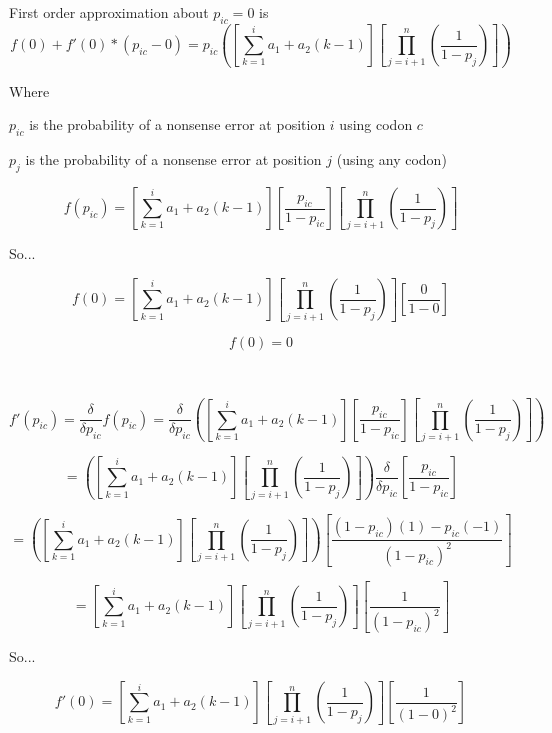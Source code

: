 \documentclass[11pt]{article} %
\begin{document}



First order approximation about $p_{ic} = 0$ is
$$f(0) + f'(0)*(p_{ic}-0)
= p_{ic}\left(
\left[\sum_{k=1}^{i} a_1 + a_2(k-1)\right]
\left[\prod_{j=i+1}^{n}(\frac{1}{1-p_{j}})\right]
\right)
$$

Where

$p_{ic}$ is the probability of a nonsense error at position $i$ using codon $c$

$p_j$ is the probability of a nonsense error at position $j$ (using any codon)

$$f(p_{ic})=
\left[\sum_{k=1}^{i} a_1 + a_2(k-1)\right]
\left[\frac{p_{ic}}{1-p_{ic}}\right]
\left[\prod_{j=i+1}^{n}(\frac{1}{1-p_{j}})\right]$$

So...

$$
f(0)=
\left[\sum_{k=1}^{i} a_1 + a_2(k-1)\right]
\left[\prod_{j=i+1}^{n}(\frac{1}{1-p_{j}})\right]
\left[\frac{0}{1-0}\right]$$

$$f(0)=0$$


\noindent\makebox[\linewidth]{\rule{\textwidth}{1pt}} 

~

$$f'(p_{ic}) = \frac{\delta}{\delta p_{ic}}f(p_{ic})=
\frac{\delta}{\delta p_{ic}}\left(
\left[\sum_{k=1}^{i} a_1 + a_2(k-1)\right]
\left[\frac{p_{ic}}{1-p_{ic}}\right]
\left[\prod_{j=i+1}^{n}(\frac{1}{1-p_{j}})\right]
\right)$$

$$=
\left(
\left[\sum_{k=1}^{i} a_1 + a_2(k-1)\right]
\left[\prod_{j=i+1}^{n}(\frac{1}{1-p_{j}})\right]
\right)
\frac{\delta}{\delta p_{ic}}
\left[\frac{p_{ic}}{1-p_{ic}}\right]
$$

$$=
\left(
\left[\sum_{k=1}^{i} a_1 + a_2(k-1)\right]
\left[\prod_{j=i+1}^{n}(\frac{1}{1-p_{j}})\right]
\right)
\left[\frac{(1-p_{ic})(1) - p_{ic}(-1)}
{(1-p_{ic})^2}\right]
$$

$$=
\left[\sum_{k=1}^{i} a_1 + a_2(k-1)\right]
\left[\prod_{j=i+1}^{n}(\frac{1}{1-p_{j}})\right]
\left[\frac{1}
{(1-p_{ic})^2}\right]
$$

So...

$$f'(0)=
\left[\sum_{k=1}^{i} a_1 + a_2(k-1)\right]
\left[\prod_{j=i+1}^{n}(\frac{1}{1-p_{j}})\right]
\left[\frac{1}
{(1-0)^2}\right]
$$
\end{document}
